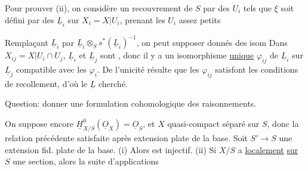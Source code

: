 Pour prouver (ii), on considère un recouvrement de $S$ par des $U_i$ tels que $\xi$ soit défini par des $\underline L_i$ sur $X_i=X|U_i$, prenant les $U_i$ assez petits


Remplaçant $\underline L_i$ par $\underline L_i\otimes_S s^*(\underline L_i)^{-1}$, on peut supposer donnés des isom
Dans $X_{ij}=X|U_i\cap U_j$, $\underline L_i$ et $\underline L_j$ sont , donc il y a un isomorphisme \uline{unique} $\varphi_{ij}$ de $\underline L_i$ sur $\underline L_j$ compatible avec les $\varphi_i$. De l'unicité résulte que les $\varphi_{ij}$ satisfont les conditions de recollement, d'où le $\underline L$ cherché.

Question: donner une formulation cohomologique des raisonnements.

 On suppose encore $\underline H^0_{X/S}(\underline O_X)=\underline O_S$, et $X$ quasi-compact séparé sur $S$, donc la relation précédente satisfaite après extension plate de la base. Soit $S'\to S$ une extension fid. plate  de la base. (i) Alors
est injectif. (ii) Si $X/S$ a \uline{localement} \uline{sur $S$} une section, alors la suite d'applications

